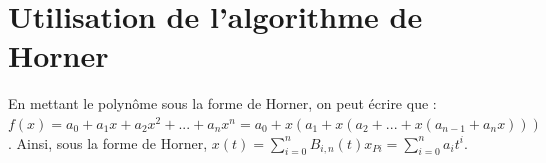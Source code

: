 \documentclass[10pt,fleqn]{article} %
\begin{document}
%
%
%
%


\section{Utilisation de l'algorithme de Horner}


%

\ifprof
\else
En mettant le polynôme sous la forme de Horner, on peut écrire que : 
$f(x)=a_0 + a_1 x + a_2 x^2 +...+ a_n x^n = a_0 + x\left( a_1  + x \left( a_2+ ...
+x \left(a_{n-1} +a_n x\right)\right)\right)$. Ainsi, sous la forme de Horner, $x(t)= \sum\limits_{i=0}^{n} B_{i,n}(t) x_{Pi} = \sum\limits_{i=0}^{n} a_i t^i$.
\end{document}

